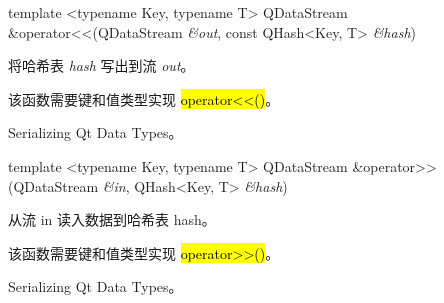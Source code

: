 template <typename Key, typename T> QDataStream \&operator<<(QDataStream \emph{\&out}, const QHash<Key, T> \emph{\&hash})

将哈希表 \emph{hash} 写出到流 \emph{out}。

该函数需要键和值类型实现 \hl{operator<<()}。

\begin{notice}[另请参阅]
Serializing Qt Data Types。
\end{notice}

template <typename Key, typename T> QDataStream \&operator>>(QDataStream \emph{\&in}, QHash<Key, T> \emph{\&hash})

从流 in 读入数据到哈希表 hash。

该函数需要键和值类型实现 \hl{operator>>()}。

\begin{notice}[另请参阅]
Serializing Qt Data Types。
\end{notice}

